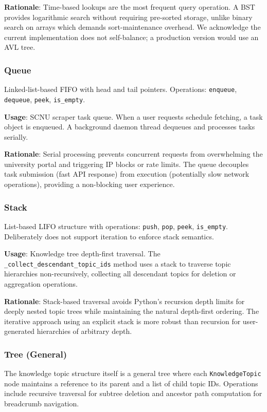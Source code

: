 \documentclass[11pt,a4paper]{article}
\begin{document}
\textbf{Rationale}: Time-based lookups are the most frequent query operation. A BST provides logarithmic search without requiring pre-sorted storage, unlike binary search on arrays which demands sort-maintenance overhead. We acknowledge the current implementation does not self-balance; a production version would use an AVL tree.

\subsubsection{Queue}
Linked-list-based FIFO with head and tail pointers. Operations: \texttt{enqueue}, \texttt{dequeue}, \texttt{peek}, \texttt{is\_empty}.

\textbf{Usage}: SCNU scraper task queue. When a user requests schedule fetching, a task object is enqueued. A background daemon thread dequeues and processes tasks serially.

\textbf{Rationale}: Serial processing prevents concurrent requests from overwhelming the university portal and triggering IP blocks or rate limits. The queue decouples task submission (fast API response) from execution (potentially slow network operations), providing a non-blocking user experience.

\subsubsection{Stack}
List-based LIFO structure with operations: \texttt{push}, \texttt{pop}, \texttt{peek}, \texttt{is\_empty}. Deliberately does not support iteration to enforce stack semantics.

\textbf{Usage}: Knowledge tree depth-first traversal. The \texttt{\_collect\_descendant\_topic\_ids} method uses a stack to traverse topic hierarchies non-recursively, collecting all descendant topics for deletion or aggregation operations.

\textbf{Rationale}: Stack-based traversal avoids Python's recursion depth limits for deeply nested topic trees while maintaining the natural depth-first ordering. The iterative approach using an explicit stack is more robust than recursion for user-generated hierarchies of arbitrary depth.

\subsubsection{Tree (General)}
The knowledge topic structure itself is a general tree where each \texttt{KnowledgeTopic} node maintains a reference to its parent and a list of child topic IDs. Operations include recursive traversal for subtree deletion and ancestor path computation for breadcrumb navigation.
\end{document}
